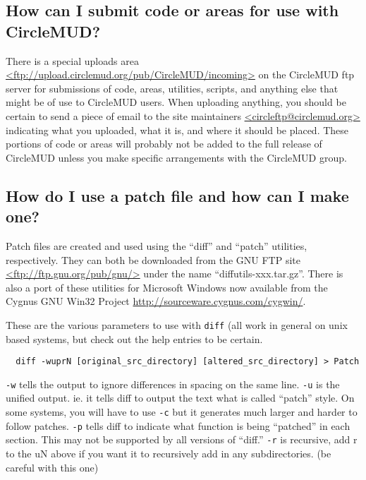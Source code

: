\documentclass[11pt]{article}
\begin{document}
\subsection{How can I submit code or areas for use with CircleMUD?}
There is a special uploads area \url{<ftp://upload.circlemud.org/pub/CircleMUD/incoming>}
on the CircleMUD ftp server for submissions of code, areas, utilities, scripts, and anything else that might be of use to CircleMUD users.  When uploading anything, you should be certain to send a piece of email to the site maintainers \url{<circleftp@circlemud.org>} indicating what you uploaded, what it is, and where it should be placed. These portions of code or areas will probably not be added to the full release of CircleMUD unless you make specific arrangements with the CircleMUD group.

\subsection{How do I use a patch file and how can I make one?}\label{patchfile}
Patch files are created and used using the ``diff'' and ``patch'' utilities, respectively.  They can both be downloaded from the GNU FTP site \url{<ftp://ftp.gnu.org/pub/gnu/>} under the name ``diffutils-xxx.tar.gz''. There is also a port of these utilities for Microsoft Windows now available from the
Cygnus GNU Win32 Project \url{http://sourceware.cygnus.com/cygwin/}.
\par
These are the various parameters to use with \texttt{diff} (all work in general on unix based systems, but check out the help entries to be certain.
\begin{verbatim}
  diff -wuprN [original_src_directory] [altered_src_directory] > Patch
\end{verbatim}
\texttt{-w} tells the output to ignore differences in spacing on the same line.\newline
\texttt{-u} is the unified output. ie. it tells diff to output the text what is called ``patch'' style.  On some systems, you will have to use \texttt{-c} but it generates much larger and harder to follow patches.\newline
\texttt{-p} tells diff to indicate what function is being ``patched'' in each section. This may not be supported by all versions of ``diff.''\newline
\texttt{-r} is recursive, add r to the uN above if you want it to recursively add in any subdirectories.  (be careful with this one)\newline
\end{document}
